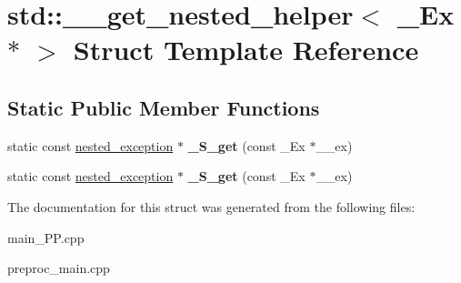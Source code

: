 \hypertarget{structstd_1_1____get__nested__helper_3_01__Ex_01_5_01_4}{\section{std\+:\+:\+\_\+\+\_\+get\+\_\+nested\+\_\+helper$<$ \+\_\+\+Ex $\ast$ $>$ Struct Template Reference}
\label{structstd_1_1____get__nested__helper_3_01__Ex_01_5_01_4}
}
\subsection*{Static Public Member Functions}
\begin{DoxyCompactItemize}
\item 
\hypertarget{structstd_1_1____get__nested__helper_3_01__Ex_01_5_01_4_abd4e766a2e47c4db9739c87642245f2a}{static const \hyperlink{classstd_1_1nested__exception}{nested\+\_\+exception} $\ast$ {\bfseries \+\_\+\+S\+\_\+get} (const \+\_\+\+Ex $\ast$\+\_\+\+\_\+ex)}\label{structstd_1_1____get__nested__helper_3_01__Ex_01_5_01_4_abd4e766a2e47c4db9739c87642245f2a}

\item 
\hypertarget{structstd_1_1____get__nested__helper_3_01__Ex_01_5_01_4_abd4e766a2e47c4db9739c87642245f2a}{static const \hyperlink{classstd_1_1nested__exception}{nested\+\_\+exception} $\ast$ {\bfseries \+\_\+\+S\+\_\+get} (const \+\_\+\+Ex $\ast$\+\_\+\+\_\+ex)}\label{structstd_1_1____get__nested__helper_3_01__Ex_01_5_01_4_abd4e766a2e47c4db9739c87642245f2a}

\end{DoxyCompactItemize}


The documentation for this struct was generated from the following files\+:\begin{DoxyCompactItemize}
\item 
main\+\_\+\+P\+P.\+cpp\item 
preproc\+\_\+main.\+cpp\end{DoxyCompactItemize}
